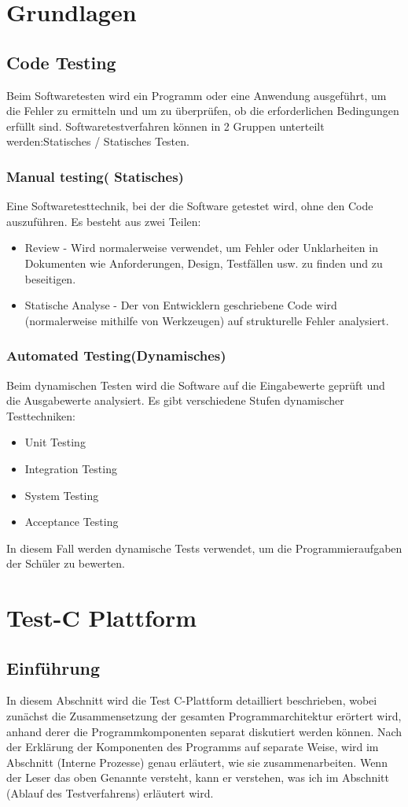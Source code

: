 \documentclass[a4paper,12pt,oneside]{book}
\begin{document}
\chapter{Grundlagen}
\section{Code Testing}
Beim Softwaretesten wird ein Programm oder eine Anwendung ausgeführt, um die Fehler zu ermitteln und um zu überprüfen, ob die erforderlichen Bedingungen erfüllt sind.
\newline
Softwaretestverfahren können in 2 Gruppen unterteilt werden:Statisches / Statisches Testen.
\subsection{Manual testing( Statisches)}
Eine Softwaretesttechnik, bei der die Software getestet wird, ohne den Code auszuführen. Es besteht aus zwei Teilen:
\begin{itemize}
	\item Review - Wird normalerweise verwendet, um Fehler oder Unklarheiten in Dokumenten wie Anforderungen, Design, Testfällen usw. zu finden und zu beseitigen.
	\item Statische Analyse - Der von Entwicklern geschriebene Code wird (normalerweise mithilfe von Werkzeugen) auf strukturelle Fehler analysiert. 
\end{itemize}
\subsection{Automated Testing(Dynamisches)}
Beim dynamischen Testen wird die Software auf die Eingabewerte geprüft und die Ausgabewerte analysiert. Es gibt verschiedene Stufen dynamischer Testtechniken: 
\begin{itemize}
	\item Unit Testing
	\item Integration Testing
	\item System Testing
	\item Acceptance Testing
\end{itemize}
In diesem Fall werden dynamische Tests verwendet, um die Programmieraufgaben der Schüler zu bewerten.

\chapter{Test-C Plattform}
\section{Einführung}
In diesem Abschnitt wird die Test C-Plattform detailliert beschrieben, wobei zunächst die Zusammensetzung der gesamten Programmarchitektur erörtert wird, anhand derer die Programmkomponenten separat diskutiert werden können. Nach der Erklärung der Komponenten des Programms auf separate Weise, wird im Abschnitt (Interne Prozesse) genau erläutert, wie sie zusammenarbeiten.
\newline
Wenn der Leser das oben Genannte versteht, kann er verstehen, was ich im Abschnitt  (Ablauf des Testverfahrens) erläutert wird.
\end{document}
